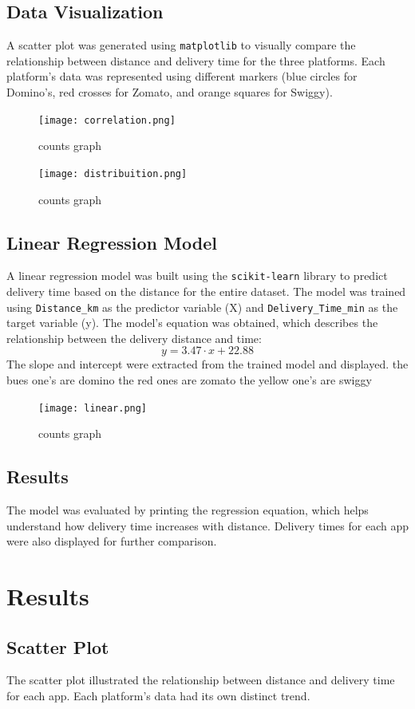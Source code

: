 \documentclass[12pt]{article}
\begin{document}
\subsection*{Data Visualization}
A scatter plot was generated using \texttt{matplotlib} to visually compare the relationship between distance and delivery time for the three platforms. Each platform’s data was represented using different markers (blue circles for Domino’s, red crosses for Zomato, and orange squares for Swiggy).
\begin{figure}[h]
    \centering
    \texttt{[image: correlation.png]}
    \caption{counts graph}
    \label{fig:label}
\end{figure}
\begin{figure}[h]
    \centering
    \texttt{[image: distribuition.png]}
    \caption{counts graph}
    \label{fig:label}
\end{figure}
\subsection*{Linear Regression Model}
A linear regression model was built using the \texttt{scikit-learn} library to predict delivery time based on the distance for the entire dataset. The model was trained using \texttt{Distance\_km} as the predictor variable (X) and \texttt{Delivery\_Time\_min} as the target variable (y). The model's equation was obtained, which describes the relationship between the delivery distance and time:
\[
y = \text{3.47} \cdot x + \text{22.88}
\]
The slope and intercept were extracted from the trained model and displayed.
the bues one's are domino the red ones are zomato the yellow one's are swiggy
\begin{figure}[h]
    \centering
    \texttt{[image: linear.png]}
    \caption{counts graph}
    \label{fig:label}
\end{figure}
\subsection*{Results}
The model was evaluated by printing the regression equation, which helps understand how delivery time increases with distance. Delivery times for each app were also displayed for further comparison.

\section*{Results}

\subsection*{Scatter Plot}
The scatter plot illustrated the relationship between distance and delivery time for each app. Each platform’s data had its own distinct trend.
\end{document}
